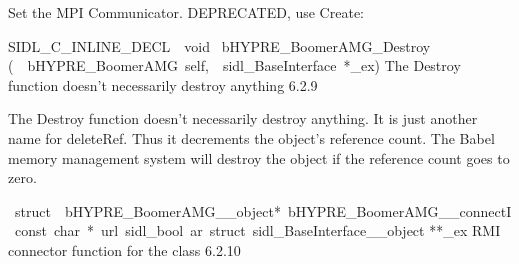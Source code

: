 \documentclass{article}
\begin{document}
\begin{cxxentry}
\begin{cxxentry}
\begin{cxxfunction}
\begin{cxxdoc}
Set the MPI Communicator.
DEPRECATED, use Create:
\end{cxxdoc}
\end{cxxfunction}
\begin{cxxfunction}
{SIDL\_C\_INLINE\_DECL\ \ void\ }
        {bHYPRE\_BoomerAMG\_Destroy}
        {(\ \ bHYPRE\_BoomerAMG\ self,\ \ sidl\_BaseInterface\ *\_ex)}
        {
The Destroy function doesn't necessarily destroy anything}
        {6.2.9}
\begin{cxxdoc}

The Destroy function doesn't necessarily destroy anything.
It is just another name for deleteRef.  Thus it decrements the
object's reference count.  The Babel memory management system will
destroy the object if the reference count goes to zero.
\end{cxxdoc}
\end{cxxfunction}
\begin{cxxvariable}
{\ struct\ \ bHYPRE\_BoomerAMG\_\_object*\ bHYPRE\_BoomerAMG\_\_connectI\ const\ char\ *\ url\ sidl\_bool\ ar\ struct\ sidl\_BaseInterface\_\_object}
        {**\_ex}
        {}
        {
RMI connector function for the class}
        {6.2.10}
\begin{cxxdoc}


\end{cxxdoc}
\end{cxxvariable}
\end{cxxentry}
\end{cxxentry}
\end{document}
